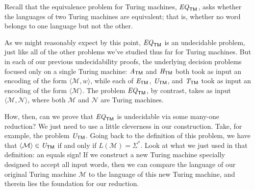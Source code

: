 Recall that the equivalence problem for Turing machines, $\mathit{EQ}_{\textsf{TM}}$, asks whether the languages of two Turing machines are equivalent; that is, whether no word belongs to one language but not the other.

As we might reasonably expect by this point, $\mathit{EQ}_{\textsf{TM}}$ is an undecidable problem, just like all of the other problems we've studied thus far for Turing machines. But in each of our previous undecidability proofs, the underlying decision problems focused only on a single Turing machine: $\mathit{A}_{\textsf{TM}}$ and $\mathit{H}_{\textsf{TM}}$ both took as input an encoding of the form $\langle \mathcal{M}, w \rangle$, while each of $\mathit{E}_{\textsf{TM}}$, $\mathit{U}_{\textsf{TM}}$, and $\mathit{T}_{\textsf{TM}}$ took as input an encoding of the form $\langle \mathcal{M} \rangle$. The problem $\mathit{EQ}_{\textsf{TM}}$, by contrast, takes as input $\langle \mathcal{M}, \mathcal{N} \rangle$, where both $\mathcal{M}$ and $\mathcal{N}$ are Turing machines.

How, then, can we prove that $\mathit{EQ}_{\textsf{TM}}$ is undecidable via some many-one reduction? We just need to use a little cleverness in our construction. Take, for example, the problem $\mathit{U}_{\textsf{TM}}$. Going back to the definition of this problem, we have that $\langle \mathcal{M} \rangle \in \mathit{U}_{\textsf{TM}}$ if and only if $L(\mathcal{M}) = \Sigma^{*}$. Look at what we just used in that definition: an equals sign! If we construct a new Turing machine specially designed to accept all input words, then we can compare the language of our original Turing machine $\mathcal{M}$ to the language of this new Turing machine, and therein lies the foundation for our reduction.

